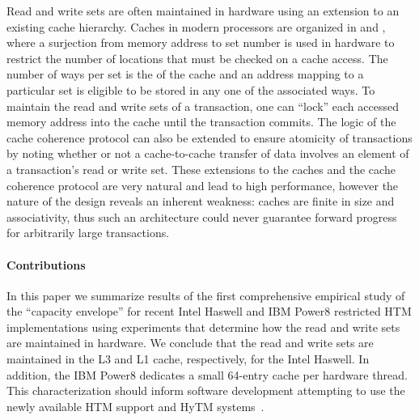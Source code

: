 Read and write sets are often maintained in hardware 
using an extension to an existing cache hierarchy.
Caches in modern processors are organized in 
and , where a surjection from memory address to
set number is used in hardware to restrict the number of
locations that must be checked on a cache access.  The
number of ways per set is the  of the cache
and an address mapping to a particular set is eligible
to be stored in any one of the associated ways.  To
maintain the read and write sets of a transaction, one can
``lock'' each accessed memory address 
into the cache until the transaction
commits.  The logic of the cache coherence protocol
can also be extended to ensure atomicity of transactions
by noting whether or not a cache-to-cache transfer of 
data involves an element of a transaction's read or write
set.  These extensions to the caches and the cache coherence
protocol are very natural and lead to high performance, 
however the nature of the design reveals an inherent weakness:
caches are finite in size and associativity, thus such an
architecture could never guarantee forward progress for 
arbitrarily large transactions.



\paragraph{Contributions}
In this paper we summarize results of the first comprehensive
empirical study of the ``capacity envelope'' for
recent Intel Haswell and IBM Power8 restricted HTM
implementations using experiments that determine how the
read and write sets are maintained in hardware. 
We conclude that the read and write sets are maintained
in the L3 and L1 cache, respectively, for the Intel Haswell.  
In addition, the IBM Power8 dedicates a small 64-entry 
cache per hardware thread.
This characterization should inform
software development attempting to use the newly available HTM support 
and HyTM systems~\cite{DamronFeLe06,MatveevSh13,MatveevSh15}.


